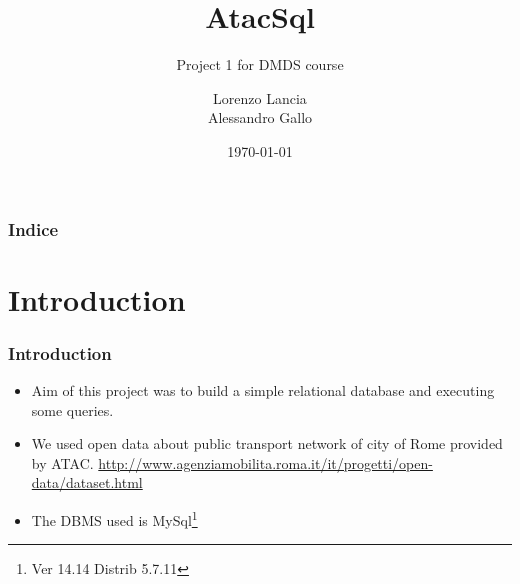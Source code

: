 \documentclass{beamer}
\title[AtacSql]{
   AtacSql }
\subtitle{Project 1 for DMDS course}
\author[L. Lancia \& A. Gallo]{
  Lorenzo Lancia \\Alessandro Gallo\medskip
  }
\institute[Sapienza Università di Roma]{
  Master Degree in Data Science \\
  Sapienza Università di Roma}
\date[\today]{
 \today}
\begin{document}
\begin{frame}
  \titlepage
\end{frame}

\begin{frame}
  \frametitle{Indice}

  \tableofcontents
\end{frame}

\section{Introduction}
\begin{frame}
  \frametitle{Introduction}
  \begin{itemize}
  \item Aim of this project was to build a simple relational database
    and executing some queries.

    \item We used open data about public transport network of city of Rome
    provided by ATAC. \url{http://www.agenziamobilita.roma.it/it/progetti/open-data/dataset.html}
  
   \item The DBMS used is MySql\footnote{Ver 14.14 Distrib 5.7.11}
  \end{itemize}

 \end{frame}
\end{document}
